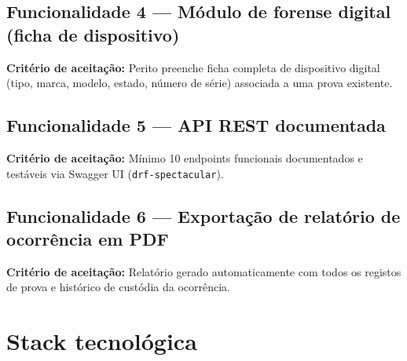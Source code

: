 \documentclass[a4paper,11pt]{article}
\begin{document}
\subsection{Funcionalidade 4 --- Módulo de forense digital (ficha de dispositivo)}

\textbf{Critério de aceitação:}
Perito preenche ficha completa de dispositivo digital (tipo, marca, modelo, estado,
número de série) associada a uma prova existente.

\subsection{Funcionalidade 5 --- API REST documentada}

\textbf{Critério de aceitação:}
Mínimo 10 endpoints funcionais documentados e testáveis via Swagger UI
(\texttt{drf-spectacular}).

\subsection{Funcionalidade 6 --- Exportação de relatório de ocorrência em PDF}

\textbf{Critério de aceitação:}
Relatório gerado automaticamente com todos os registos de prova e histórico de
custódia da ocorrência.

\section{Stack tecnológica}
\end{document}
